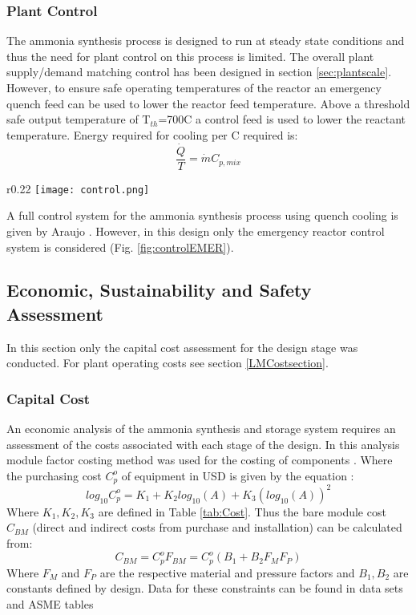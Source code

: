 \subsubsection{Plant Control}


The ammonia synthesis process is designed to run at steady state conditions and thus the need for plant control on this process is limited. The overall plant supply/demand matching control has been designed in section \ref{sec:plantscale}. However, to ensure safe operating temperatures of the reactor an emergency quench feed can be used to lower the reactor feed temperature. Above a threshold safe output temperature of T$_{th}$=700\textdegree C a control feed is used to lower the reactant temperature. Energy required for cooling per \textdegree C required is:
\begin{equation}
\frac{\dot{Q}}{T} = \dot{m}C_{p,mix}
\end{equation}

\begin{wrapfigure}{r}{0.22\textwidth}
		\texttt{[image: control.png]}
		\caption{Reactor emergency control \label{fig:controlEMER}}
\end{wrapfigure}
A full control system for the ammonia synthesis process using quench cooling is given by Araujo \cite{Araujo2008}. However, in this design only the emergency reactor control system is considered (Fig. \ref{fig:controlEMER}). 


\subsection{Economic, Sustainability and Safety Assessment}

In this section only  the capital cost assessment for the design stage was conducted. For plant operating costs see section \ref{LMCostsection}.
\subsubsection{Capital Cost}
An economic analysis of the ammonia synthesis and storage system requires an assessment of the costs associated with each stage of the design. In this analysis module factor costing method was used for the costing of components \cite{RichardTurtonRichardC.BailieWallaceB.Whiting2013}. Where the purchasing cost $C_p^o$ of equipment in USD is given by the equation \cite{Banares-alcantara2014}:
\begin{equation}
	log_{10}C_p^o = K_1 + K_2log_{10}(A)+K_3(log_{10}(A))^2
\end{equation}
Where $K_1,K_2,K_3$ are defined in Table \ref{tab:Cost}. Thus the bare module cost $C_{BM}$ (direct and indirect costs from purchase and installation) can be calculated from:
\begin{equation}
C_{BM} =C_p^oF_{BM} = C_p^o(B_1+B_2F_MF_P)
\end{equation}
Where $F_M$ and $F_P$ are the respective material and pressure factors and $B_1, B_2$ are constants defined by design. Data for these constraints can be found in data sets and ASME tables \cite{RichardTurtonRichardC.BailieWallaceB.Whiting2013}

